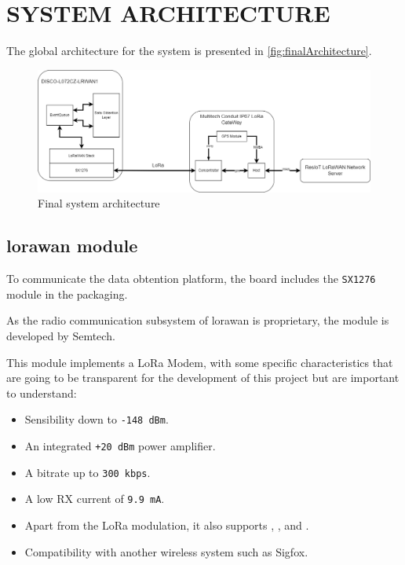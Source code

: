 \section{SYSTEM ARCHITECTURE}
The global architecture for the system is presented in \autoref{fig:finalArchitecture}.

\begin{figure}[H]
    \centering
    \includegraphics[width=1\textwidth]{images/3/Modules.drawio.png}
    \caption{Final system architecture}
    \label{fig:finalArchitecture}
\end{figure}

\subsection{\acrshort{lorawan} module}

To communicate the data obtention platform, the board\cite{DISCOL072CZLRWAN1Mbeda} includes the \texttt{SX1276}\cite{SX1276}  module in the packaging.

As the radio communication subsystem of \acrshort{lorawan} is proprietary, the module is developed by Semtech.

This module implements a LoRa Modem, with some specific characteristics that are going to be transparent for the development of this project but are important to understand:
\begin{itemize}
    \item Sensibility down to \texttt{-148 dBm}.
    \item An integrated \texttt{+20 dBm} power amplifier.
    \item A bitrate up to \texttt{300 kbps}.
    \item A low RX current of \texttt{9.9 mA}.
    \item Apart from the LoRa modulation, it also supports , ,  and .
    \item Compatibility with another wireless system such as Sigfox.
\end{itemize}

